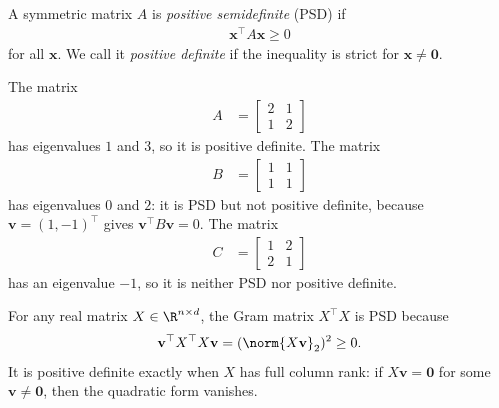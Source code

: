 \documentclass[a4paper, 12pt]{book}
\begin{document}
\begin{definition}
    A symmetric matrix ${A}$ is \emph{positive semidefinite} (PSD) if
    \begin{align}
        \mathbf{x}^\top {A}\mathbf{x} \geq 0
    \end{align}
    for all $\mathbf{x}$. We call it \emph{positive definite} if the inequality is strict for $\mathbf{x} \neq \mathbf{0}$.
\end{definition}

\begin{example}
    The matrix
    \begin{align}
        {A} &= \begin{bmatrix}2&1\\1&2\end{bmatrix}
    \end{align}
    has eigenvalues $1$ and $3$, so it is positive definite. The matrix
    \begin{align}
        {B} &= \begin{bmatrix}1&1\\1&1\end{bmatrix}
    \end{align}
    has eigenvalues $0$ and $2$: it is PSD but not positive definite, because
    $\mathbf{v}=(1,-1)^\top$ gives $\mathbf{v}^\top{B}\mathbf{v}=0$. The matrix
    \begin{align}
        C &= \begin{bmatrix}1&2\\2&1\end{bmatrix}    
    \end{align}
    has an eigenvalue $-1$, so it
    is neither PSD nor positive definite.
\end{example}

\begin{example}
    For any real matrix $X \in \R^{n \times d}$, the Gram matrix
    $X^\top X$ is PSD because
    \begin{align}
        \mathbf{v}^\top X^\top X\mathbf{v}
        = (\norm{X\mathbf{v}}_2)^2 \geq 0.
    \end{align}
    It is positive definite exactly when $X$ has full column rank: if
    $X\mathbf{v}=\mathbf{0}$ for some $\mathbf{v}\neq\mathbf{0}$, then the
    quadratic form vanishes.
\end{example}
\end{document}
